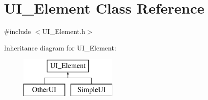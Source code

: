 \hypertarget{class_u_i___element}{}\section{U\+I\+\_\+\+Element Class Reference}
\label{class_u_i___element}


{\ttfamily \#include $<$U\+I\+\_\+\+Element.\+h$>$}

Inheritance diagram for U\+I\+\_\+\+Element\+:\begin{figure}[H]
\begin{center}
\leavevmode
\includegraphics[height=2.000000cm]{class_u_i___element}
\end{center}
\end{figure}
